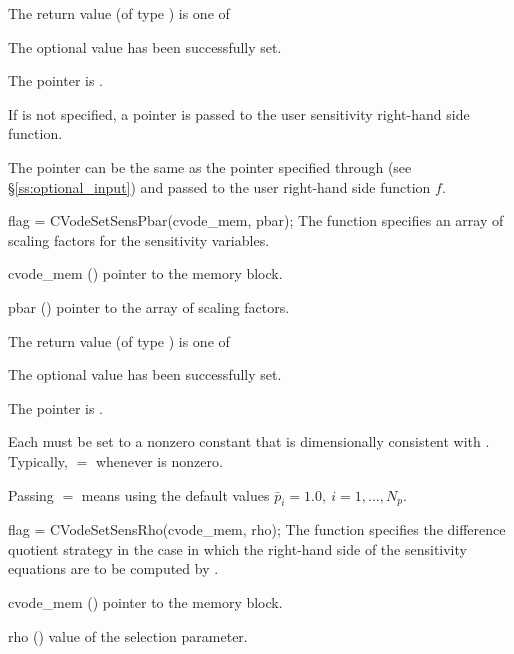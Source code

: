{
  The return value  (of type ) is one of
  \begin{args}
  \item[\Id{SUCCESS}] 
    The optional value has been successfully set.
  \item[\Id{CVS\_NO\_MEM}]
    The  pointer is .
  \end{args}
}
{
  If  is not specified, a  pointer is
  passed to the user sensitivity right-hand side function.

  The pointer  can be the same as the pointer 
  specified through  (see \S\ref{ss:optional_input})
  and passed to the user right-hand side function $f$.
}
{
  flag = CVodeSetSensPbar(cvode\_mem, pbar);
}
{
  The function  specifies an array of scaling factors for 
  the sensitivity variables.
}
{
  \begin{args}
  \item[cvode\_mem] ()
    pointer to the {\cvodes} memory block.
  \item[pbar] ()
    pointer to the array of scaling factors.
  \end{args}
}
{
  The return value  (of type ) is one of
  \begin{args}
  \item[\Id{SUCCESS}] 
    The optional value has been successfully set.
  \item[\Id{CVS\_NO\_MEM}]
    The  pointer is .
  \end{args}
}
{
  Each  must be set to a nonzero constant that is
  dimensionally consistent with .
  Typically, $=$ whenever  is nonzero.

  Passing $=$ means using the default values
  ${\bar p}_i = 1.0, ~ i = 1,\ldots,N_p$.
}
{
  flag = CVodeSetSensRho(cvode\_mem, rho);
}
{
  The function  specifies the difference quotient strategy in
  the case in which the right-hand side of the sensitivity equations are to
  be computed by {\cvodes}.
}
{
  \begin{args}
  \item[cvode\_mem] ()
    pointer to the {\cvodes} memory block.
  \item[rho] ()
    value of the selection parameter.
  \end{args}
}
